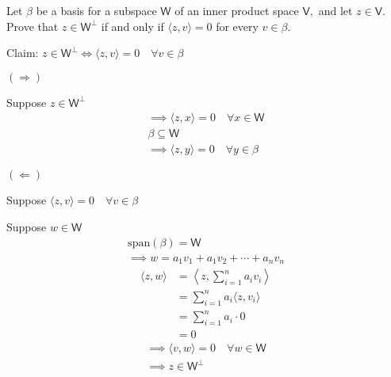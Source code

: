 Let $\beta$ be a basis for a subspace $\mathsf{W}$ of an inner product
space $\mathsf{V},$ and let $z \in \mathsf{V}.$ Prove that $z \in
\mathsf{W}^\perp$ if and only if $\langle z, v \rangle = 0$ for every
$v \in \beta.$

Claim: $z \in \mathsf{W}^\perp \Leftrightarrow \langle z,v \rangle = 0
\quad \forall v \in \beta$

$(\Rightarrow)$ 

Suppose $z \in \mathsf{W}^\perp$ 
\begin{gather}
\implies \langle z,x \rangle = 0 \quad \forall x \in \mathsf{W}\\
\beta \subseteq \mathsf{W}\\
\implies \langle z,y \rangle = 0 \quad \forall y \in \beta
\end{gather}

$(\Leftarrow)$

Suppose $\langle z,v\rangle =0 \quad \forall v \in \beta$

Suppose $w \in \mathsf{W}$
\begin{gather}
\text{span}(\beta) = \mathsf{W}\\
\implies w = a_1v_1 + a_1v_2 + \dotsb + a_nv_n
\end{gather}
\begin{align}
\langle z,w \rangle &= \left\langle z, \sum\limits_{i=1}^n a_iv_i\right\rangle \\
&= \sum\limits_{i=1}^n a_i \langle z,v_i\rangle\\
&= \sum\limits_{i=1}^n a_i \cdot 0\\
&= 0
\end{align}
\begin{gather}
\implies \langle v,w \rangle = 0 \quad \forall w \in \mathsf{W}\\
\implies z \in \mathsf{W}^\perp
\end{gather}
